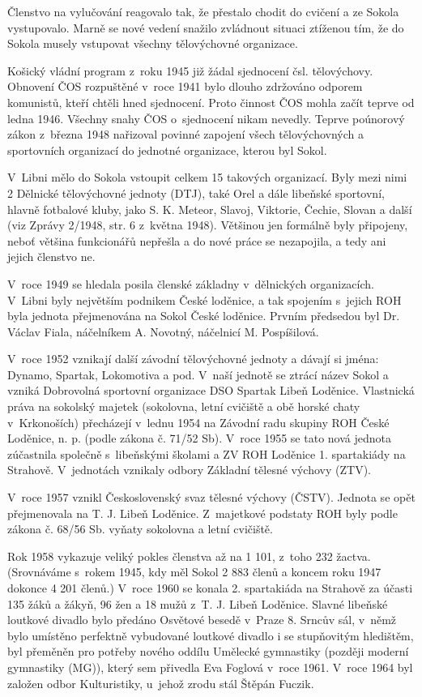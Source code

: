 \documentclass[a5paper, 12pt, twoside]{article}
\begin{document}
Členstvo na vylučování reagovalo tak, že přestalo chodit do cvičení a ze
Sokola vystupovalo. Marně se nové vedení snažilo zvládnout situaci
ztíženou tím, že do Sokola musely vstupovat všechny tělovýchovné
organizace.

Košický vládní program z~roku 1945 již žádal sjednocení čsl.
tělovýchovy. Obnovení ČOS rozpuštěné v~roce 1941 bylo dlouho zdržováno
odporem komunistů, kteří chtěli hned sjednocení. Proto činnost ČOS mohla
začít teprve od ledna 1946. Všechny snahy ČOS o~sjednocení nikam
nevedly. Teprve poúnorový zákon z~března 1948 nařizoval povinné zapojení
všech tělovýchovných a sportovních organizací do jednotné organizace,
kterou byl Sokol.

V~Libni mělo do Sokola vstoupit celkem 15 takových organizací. Byly mezi
nimi 2 Dělnické tělovýchovné jednoty (DTJ), také Orel a dále libeňské
sportovní, hlavně fotbalové kluby, jako S. K. Meteor, Slavoj, Viktorie,
Čechie, Slovan a další (viz Zprávy 2/1948, str. 6 z~května 1948).
Většinou jen formálně byly připojeny, neboť většina funkcionářů nepřešla
a do nové práce se nezapojila, a tedy ani jejich členstvo ne.

V~roce 1949 se hledala posila členské základny v~dělnických
organizacích. V~Libni byly největším podnikem České loděnice, a tak
spojením s~jejich ROH byla jednota přejmenována na Sokol České loděnice.
Prvním předsedou byl Dr. Václav Fiala, náčelníkem A. Novotný, náčelnicí
M. Pospíšilová.

V~roce 1952 vznikají další závodní tělovýchovné jednoty a dávají si
jména: Dynamo, Spartak, Lokomotiva a pod. V~naší jednotě se ztrácí název
Sokol a vzniká Dobrovolná sportovní organizace DSO Spartak Libeň
Loděnice. Vlastnická práva na sokolský majetek (sokolovna, letní
cvičiště a obě horské chaty v~Krkonoších) přecházejí v~lednu 1954 na
Závodní radu skupiny ROH České Loděnice, n. p. (podle zákona č. 71/52
Sb). V~roce 1955 se tato nová jednota zúčastnila společně s~libeňskými
školami a ZV ROH Loděnice 1. spartakiády na Strahově. V~jednotách
vznikaly odbory Základní tělesné výchovy (ZTV).

V~roce 1957 vznikl Československý svaz tělesné výchovy (ČSTV). Jednota
se opět přejmenovala na T. J. Libeň Loděnice. Z~majetkové podstaty ROH
byly podle zákona č. 68/56 Sb. vyňaty sokolovna a letní cvičiště.

Rok 1958 vykazuje veliký pokles členstva až na 1 101, z~toho 232 žactva.
(Srovnáváme s~rokem 1945, kdy měl Sokol 2 883 členů a koncem roku 1947
dokonce 4 201 členů.) V~roce 1960 se konala 2. spartakiáda na Strahově
za účasti 135 žáků a žákyň, 96 žen a 18 mužů z~T. J. Libeň Loděnice.
Slavné libeňské loutkové divadlo bylo předáno Osvětové besedě v~Praze 8.
Srncův sál, v~němž bylo umístěno perfektně vybudované loutkové divadlo i
se stupňovitým hledištěm, byl přeměněn pro potřeby nového oddílu
Umělecké gymnastiky (později moderní gymnastiky (MG)), který sem
přivedla Eva Foglová v~roce 1961. V~roce 1964 byl založen odbor
Kulturistiky, u~jehož zrodu stál Štěpán Fuczik.
\end{document}
